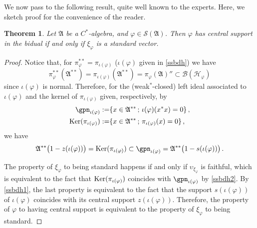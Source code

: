 \documentclass[12pt]{amsart}
\numberwithin{equation}{section}
\def\cb{{\mathcal B}}
\def\ch{{\mathcal H}}
\def\cs{{\mathcal S}}
\def\ga{{\mathfrak A}} \def\gpa{{\mathfrak a}}
\def\f{\varphi}\def\ff{\phi} \def\F{\Phi}
\newtheorem{thm}{Theorem}[section]
\begin{document}
We now pass to the following result, quite well known to the experts. Here, we sketch proof for the convenience of the reader.
\begin{thm}
\label{zscsu}
Let $\ga$ be a $C^*$-algebra, and $\f\in\cs(\ga)$. Then $\f$ has central support in the bidual if and only if $\xi_\f$ is a standard vector.
\end{thm}
\begin{proof}
Notice that, for $\pi_\f^{**}=\pi_{\iota(\f)}$ ($\iota(\f)$ given in \eqref{ssbdh}) we have 
\begin{equation}
\label{ssbdh2}
\pi_\f^{**}(\ga^{**})=\pi_{\iota(\f)}(\ga^{**})=\pi_\f(\ga)''\subset\cb(\ch_\f)
\end{equation}
since $\iota(\f)$ is normal. Therefore, for the (weak${}^*$-closed) left ideal associated to $\iota(\f)$ and
the kernel of $\pi_{\iota(\f)}$ given, respectively, by
\begin{align*}
\gpn_{\iota(\f)}:=&\{x\in\ga^{**}\,;\,\iota(\f)(x^*x)=0\}\,,\\ 
{\rm Ker}(\pi_{\iota(\f)}):=&\{x\in\ga^{**}\,;\,\pi_{\iota(\f)}(x)=0\}\,,
\end{align*}
we have
\begin{equation}
\label{ssbdh1}
\ga^{**}\big(1-z(\iota(\f))\big)={\rm Ker}(\pi_{\iota(\f)})\subset\gpn_{\iota(\f)}=\ga^{**}\big(1-s(\iota(\f))\big)\,.
\end{equation}

The property of $\xi_\f$ to being standard happens if and only if $\upsilon_{\xi_\f}$ is faithful, which is equivalent to the fact that
${\rm Ker}(\pi_{\iota(\f)})$ coincides with $\gpn_{\iota(\f)}$ by \eqref{ssbdh2}. By \eqref{ssbdh1}, the last property is equivalent to
the fact that the support $s(\iota(\f))$ of $\iota(\f)$ coincides with its central support $z(\iota(\f))$. Therefore, the property of $\f$ to having central support is equivalent to the property of $\xi_\f$ to being standard.
\end{proof}
\end{document}
